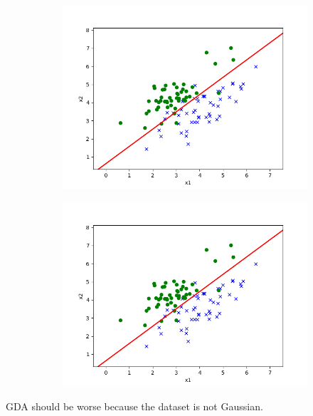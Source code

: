 \begin{answer}
\begin{figure}[htbp]
    \begin{subfigure}[b]{0.5\linewidth}
        \centering
        \includegraphics[width=\linewidth]{pics/p01b_pred_2.txt.png}
    \end{subfigure}
    \begin{subfigure}[b]{0.5\linewidth}
        \centering
        \includegraphics[width=\linewidth]{pics/p01e_pred_2.txt.png}
    \end{subfigure}
\end{figure}

GDA should be worse because the dataset is not Gaussian.
\end{answer}
